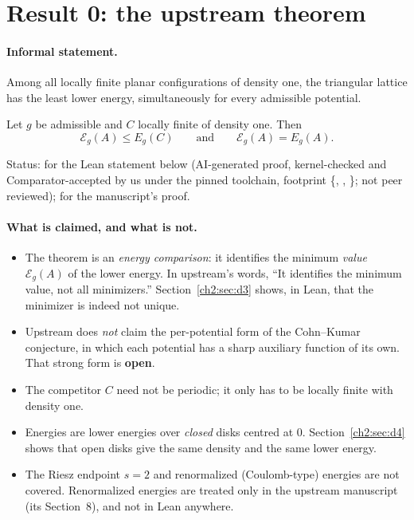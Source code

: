 \section{Result 0: the upstream theorem}\label{ch2:sec:upstream}

\paragraph{Informal statement.} Among all locally finite planar configurations of density one, the triangular lattice
has the least lower energy, simultaneously for every admissible potential.

\begin{theorem}\label{ch2:thm:upstream}
Let $g$ be admissible and $C$ locally finite of density one. Then
\[
\mathcal{E}_g(A)\le E_g(C)\qquad\text{and}\qquad \mathcal{E}_g(A)=E_g(A).
\]
\end{theorem}
Status: \tierA{} for the Lean statement below (AI-generated proof, kernel-checked and Comparator-accepted by us under
the pinned toolchain, footprint \{, , \}; not peer reviewed);
\tierL{} for the manuscript's proof.

\paragraph{What is claimed, and what is not.}
\begin{itemize}
\item The theorem is an \emph{energy comparison}: it identifies the minimum \emph{value} $\mathcal{E}_g(A)$ of the lower
  energy. In upstream's words, ``It identifies the minimum value, not all minimizers.'' \tierL{} Section~\ref{ch2:sec:d3}
  shows, in Lean, that the minimizer is indeed not unique.
\item Upstream does \emph{not} claim the per-potential form of the Cohn--Kumar conjecture, in which each potential has a
  sharp auxiliary function of its own. That strong form is \textbf{open}. \tierL
\item The competitor $C$ need not be periodic; it only has to be locally finite with density one.
\item Energies are lower energies over \emph{closed} disks centred at $0$. Section~\ref{ch2:sec:d4} shows that open disks
  give the same density and the same lower energy.
\item The Riesz endpoint $s=2$ and renormalized (Coulomb-type) energies are not covered. Renormalized energies are
  treated only in the upstream manuscript (its Section~8), and not in Lean anywhere. \tierL
\end{itemize}

